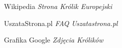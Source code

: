 \documentclass{article}
\begin{document}
\begin{thebibliography}{9}

Wikipedia
\textit{Strona Królik Europejski}
\label{equat}

UszataStrona.pl
\textit{FAQ Uszatastrona.pl}
\label{tabela}

Grafika Google
\textit{Zdjęcia Królików}
\label{zdjecia}

\end{thebibliography}
\end{document}
